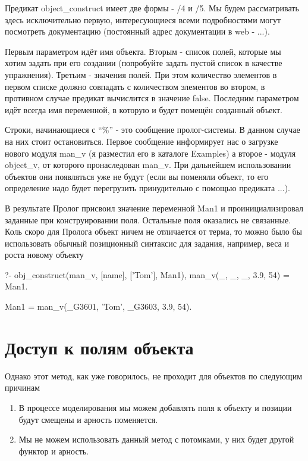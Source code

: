 \documentclass[a4paper]{book}
\begin{document}
Предикат object\_construct имеет две формы - /4 и /5. Мы будем
рассматривать здесь исключительно первую, интересующиеся всеми
подробностями могут посмотреть документацию (постоянный адрес
документации в web - ...).

Первым параметром идёт имя объекта. Вторым - список полей,
которые мы хотим задать при его создании (попробуйте задать
пустой список в качестве упражнения). Третьим - значения
полей. При этом количество элементов в первом списке должно
совпадать с количеством элементов во втором, в противном случае
предикат вычислится в значение false. Последним параметром идёт
всегда имя переменной, в которую и будет помещён созданный
объект. 

Строки, начинающиеся с ``\%'' - это сообщение пролог-системы. В
данном случае на них стоит остановиться. Первое сообщение
информирует нас о загрузке нового модуля man\_v (я разместил его
в каталоге Examples) а второе - модуля object\_v, от которого
пронаследован man\_v. При дальнейшем использовании объектов они
появляться уже не будут (если вы поменяли объект, то его
определение надо будет перегрузить принудительно с помощью
предиката ...).

В результате Пролог присвоил значение переменной Man1 и
проинициализировал заданные при конструировании поля. Остальные
поля оказались не связанные. Коль скоро для Пролога объект ничем
не отличается от терма, то можно было бы использовать обычный
позиционный синтаксис для задания, например, веса и роста новому
объекту

\begin{example}{}{}
?- obj_construct(man_v, [name], ['Tom'], Man1), 
   man_v(_, _, _, 3.9, 54) = Man1.

Man1 = man_v(_G3601, 'Tom', _G3603, 3.9, 54).
\end{example}

\section{Доступ к полям объекта}

Однако этот метод, как уже говорилось, не проходит для объектов
по следующим причинам

\begin{enumerate}
\item В процессе моделирования мы можем добавлять поля к объекту и
позиции будут смещены и арность поменяется.
\item Мы не можем использовать данный метод с потомками, у них будет
другой функтор и арность.
\end{enumerate}
\end{document}
